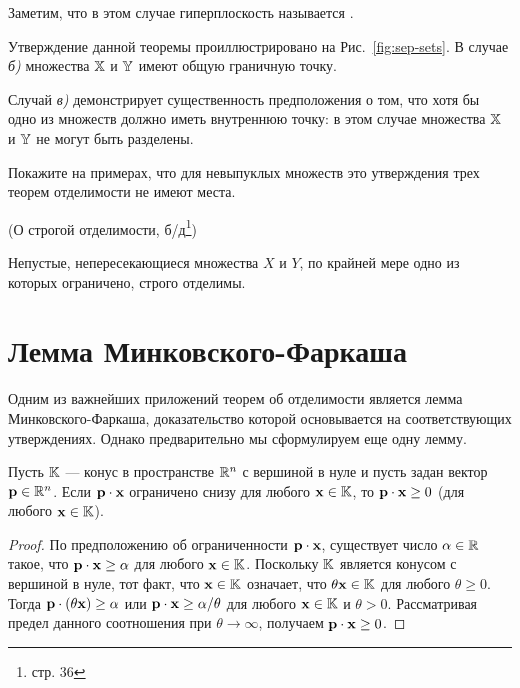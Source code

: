 

Заметим, что в этом случае гиперплоскость называется
.

Утверждение данной теоремы проиллюстрировано на
Рис.~\ref{fig:sep-sets}. В случае \emph{б)} множества $\mathbb{X}$ и
$\mathbb{Y}$ имеют общую граничную точку.


Случай \emph{в)} демонстрирует существенность предположения о том,
что хотя бы одно из множеств должно иметь внутреннюю точку: в этом
случае множества $\mathbb{X}$ и $\mathbb{Y}$ не могут быть разделены.

\begin{exer}
Покажите на примерах, что для невыпуклых множеств это утверждения
трех теорем отделимости не имеют места.
\end{exer}


\begin{teo}(О строгой отделимости, б/д\/\footnote{\cite{Kapustin:2001} стр. 36})

Непустые, непересекающиеся множества $X$ и $Y$, по крайней мере одно
из которых ограничено, строго отделимы. \end{teo}

\section{Лемма Минковского-Фаркаша}

Одним из важнейших приложений теорем об отделимости является лемма
Минковского-Фаркаша, доказательство которой основывается на
соответствующих утверждениях. Однако предварительно мы сформулируем
еще одну лемму.

\begin{lem}

Пусть $\mathbb{K}$ --- конус в пространстве $\mathbb{R}^n$ с
вершиной в нуле и пусть задан вектор $\mathbf{p} \in \mathbb{R}^n$. Если $\mathbf{p}
\cdot \mathbf{x}$ ограничено снизу для любого $\mathbf{x} \in \mathbb{K}$, то
$\mathbf{p} \cdot \mathbf{x} \geq 0$ (для любого $\mathbf{x} \in \mathbb{K}$).
\end{lem}


\begin{proof}

По предположению об ограниченности $\mathbf{p} \cdot \mathbf{x}$, существует
число $\alpha \in \mathbb{R}$ такое, что $\mathbf{p} \cdot \mathbf{x} \geq \alpha$
для любого $\mathbf{x} \in \mathbb{K}$. Поскольку $\mathbb{K}$ является конусом
с вершиной в нуле, тот факт, что $\mathbf{x} \in \mathbb{K}$ означает, что
$\theta \mathbf{x} \in \mathbb{K}$ для любого $\theta \geq 0$. Тогда $\mathbf{p}
\cdot (\theta \mathbf{x}) \geq \alpha$ или $\mathbf{p} \cdot \mathbf{x} \geq
\alpha / \theta$ для любого $\mathbf{x} \in \mathbb{K}$ и $\theta > 0$.
Рассматривая предел данного соотношения при $\theta \rightarrow
\infty$, получаем $\mathbf{p} \cdot \mathbf{x} \geq 0$.
\end{proof}


